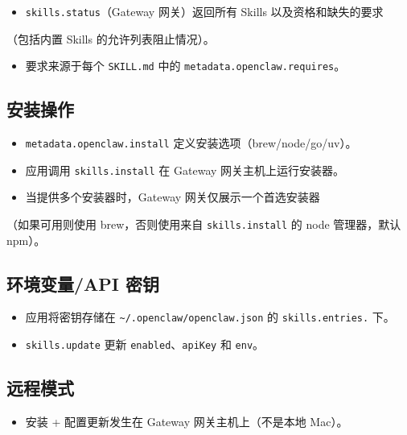 \begin{itemize}
  \item \texttt{skills.status}（Gateway 网关）返回所有 Skills 以及资格和缺失的要求
\end{itemize}

（包括内置 Skills 的允许列表阻止情况）。
\begin{itemize}
  \item 要求来源于每个 \texttt{SKILL.md} 中的 \texttt{metadata.openclaw.requires}。
\end{itemize}


\subsection{安装操作}


\begin{itemize}
  \item \texttt{metadata.openclaw.install} 定义安装选项（brew/node/go/uv）。
  \item 应用调用 \texttt{skills.install} 在 Gateway 网关主机上运行安装器。
  \item 当提供多个安装器时，Gateway 网关仅展示一个首选安装器
\end{itemize}

（如果可用则使用 brew，否则使用来自 \texttt{skills.install} 的 node 管理器，默认 npm）。

\subsection{环境变量/API 密钥}


\begin{itemize}
  \item 应用将密钥存储在 \texttt{\textasciitilde{}/.openclaw/openclaw.json} 的 \texttt{skills.entries.} 下。
  \item \texttt{skills.update} 更新 \texttt{enabled}、\texttt{apiKey} 和 \texttt{env}。
\end{itemize}


\subsection{远程模式}


\begin{itemize}
  \item 安装 + 配置更新发生在 Gateway 网关主机上（不是本地 Mac）。
\end{itemize}



